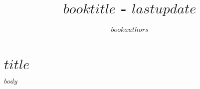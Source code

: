 \documentclass{tufte-book}
\title{$booktitle$ - $lastupdate$}
\author{$bookauthors$}
\begin{document}
\chapter{$title$}

$body$
\end{document}
